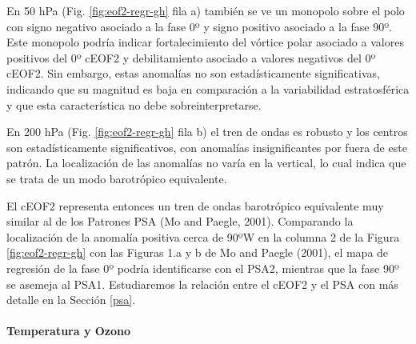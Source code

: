 \documentclass[12pt,oneside]{reedthesis}
\begin{document}
En 50 hPa (Fig. \ref{fig:eof2-regr-gh} fila a) también se ve un monopolo sobre el polo con signo negativo asociado a la fase 0º y signo positivo asociado a la fase 90º.
Este monopolo podría indicar fortalecimiento del vórtice polar asociado a valores positivos del 0º cEOF2 y debilitamiento asociado a valores negativos del 0º cEOF2.
Sin embargo, estas anomalías no son estadísticamente significativas, indicando que su magnitud es baja en comparación a la variabilidad estratosférica y que esta característica no debe sobreinterpretarse.

En 200 hPa (Fig. \ref{fig:eof2-regr-gh} fila b) el tren de ondas es robusto y los centros son estadísticamente significativos, con anomalías insignificantes por fuera de este patrón.
La localización de las anomalías no varía en la vertical, lo cual indica que se trata de un modo barotrópico equivalente.

El cEOF2 representa entonces un tren de ondas barotrópico equivalente muy similar al de los Patrones PSA (Mo and Paegle, 2001).
Comparando la localización de la anomalía positiva cerca de 90ºW en la columna 2 de la Figura \ref{fig:eof2-regr-gh} con las Figuras 1.a y b de Mo and Paegle (2001), el mapa de regresión de la fase 0º podría identificarse con el PSA2, mientras que la fase 90º se asemeja al PSA1.
Estudiaremos la relación entre el cEOF2 y el PSA con más detalle en la Sección \ref{psa}.

\hypertarget{temperatura-y-ozono}{%
\paragraph{Temperatura y Ozono}\label{temperatura-y-ozono}}
\end{document}
